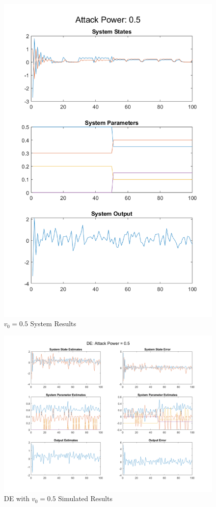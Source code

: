 \documentclass[]{ieeetran}
\begin{document}
\begin{figure}
	\centering
	\includegraphics[width=0.7\linewidth]{../../fig/SystemResponse_attack_0_5}
	\caption{$v_0 = 0.5$ System Results}
	\label{fig:systemresponseattack05}
\end{figure}

\begin{figure}
	\centering
	\includegraphics[width=\linewidth]{../../fig/DE_attack_0_5}
	\caption{DE with $v_0 = 0.5$ Simulated Results}
	\label{fig:deattack05}
\end{figure}
\end{document}
